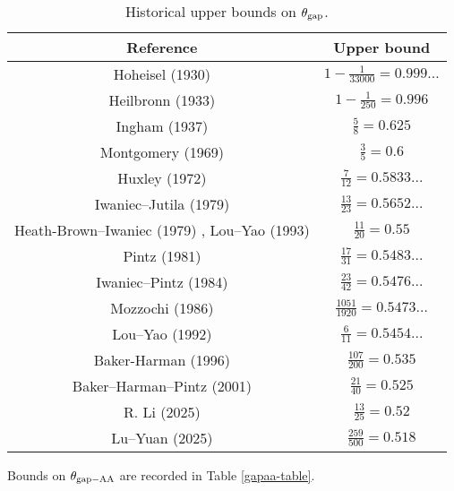 \begin{table}[ht]
    \caption{Historical upper bounds on $\theta_{\mathrm{gap}}$.}
    \centering
    \renewcommand{\arraystretch}{1.2}
    \begin{tabular}{|c|c|}
    \hline
    Reference & Upper bound \\
    \hline
    Hoheisel (1930) \cite{hoheisel_1930} & $1 - \frac{1}{33000} = 0.999\dots$ \\
    \hline
    Heilbronn (1933) \cite{heilbronn_1933} & $1 - \frac{1}{250} = 0.996$ \\
    \hline
    Ingham (1937) \cite{ingham_difference_1937} & $\frac{5}{8} = 0.625$ \\
    \hline
    Montgomery (1969) \cite{montgomery_1969} & $\frac{3}{5} = 0.6$ \\
    \hline
    Huxley (1972) \cite{Huxley} & $\frac{7}{12} = 0.5833\dots$ \\
    \hline
    Iwaniec--Jutila (1979)\cite{iwaniec-jutila} & $\frac{13}{23} = 0.5652\dots$ \\
    \hline
    Heath-Brown--Iwaniec (1979) \cite{heathbrown_iwaniec_1979}, Lou--Yao (1993) \cite{lou_yao_number_1993}& $\frac{11}{20} = 0.55$ \\
    \hline
    Pintz (1981) \cite{pintz_1981} & $\frac{17}{31} = 0.5483\dots$ \\
    \hline
    Iwaniec--Pintz (1984) \cite{iwaniec-pintz} & $\frac{23}{42} = 0.5476\dots$\\
    \hline
    Mozzochi (1986) \cite{mozzochi-consecutive} & $\frac{1051}{1920} = 0.5473\dots$ \\
    \hline
    Lou--Yao (1992) \cite{lou-yao-chebychev} & $\frac{6}{11} = 0.5454\dots$\\
    \hline
    Baker-Harman (1996) \cite{baker-harman} & $\frac{107}{200} = 0.535$\\
    \hline
    Baker--Harman--Pintz (2001) \cite{baker-harman-pintz} & $\frac{21}{40} = 0.525$ \\
    \hline
    R. Li (2025) \cite{li_number_2025} & $\frac{13}{25} = 0.52$\\
    \hline
    Lu--Yuan (2025) \cite{lu_yuan_primes_2025} & $\frac{259}{500} = 0.518$\\
    \hline
    \end{tabular}
    \end{table}\label{gapmax-table}

Bounds on $\theta_{\mathrm{gap-AA}}$ are recorded in Table \ref{gapaa-table}.

